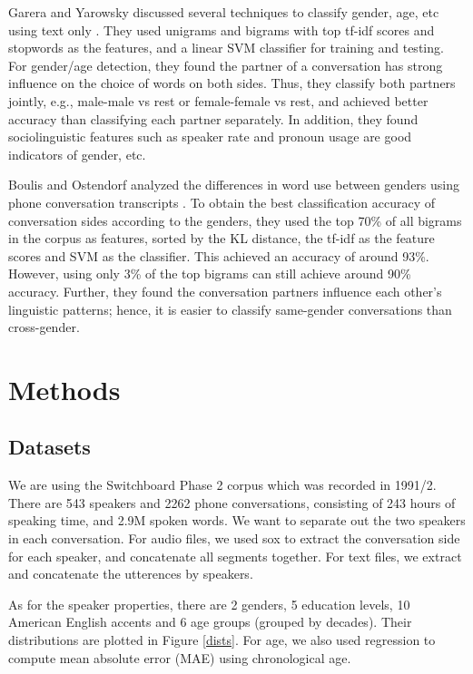 \documentclass[a4paper]{article}
\begin{document}
Garera and Yarowsky discussed several techniques to classify gender, age, etc using text only \cite{garera}. They used unigrams and bigrams with top tf-idf scores and stopwords as the features, and a linear SVM classifier for training and testing. For gender/age detection, they found the partner of a conversation has strong influence on the choice of words on both sides. Thus, they classify both partners jointly, e.g., male-male vs rest or female-female vs rest, and achieved better accuracy than classifying each partner separately. In addition, they found sociolinguistic features such as speaker rate and pronoun usage are good indicators of gender, etc.

Boulis and Ostendorf analyzed the differences in word use between genders using phone conversation transcripts \cite{boulis}. To obtain the best classification accuracy of conversation sides according to the genders, they used the top 70\% of all bigrams in the corpus as features, sorted by the KL distance, the tf-idf as the feature scores and SVM as the classifier. This achieved an accuracy of around 93\%. However, using only 3\% of the top bigrams can still achieve around 90\% accuracy. Further, they found the conversation partners influence each other's linguistic patterns; hence, it is easier to classify same-gender conversations than cross-gender. 

\section{Methods}

\subsection{Datasets}
We are using the Switchboard Phase 2 corpus which was recorded in 1991/2. There are 543 speakers and 2262 phone conversations, consisting of 243 hours of speaking time, and 2.9M spoken words. We want to separate out the two speakers in each conversation. For audio files, we used sox to extract the conversation side for each speaker, and concatenate all segments together. For text files, we extract and concatenate the utterences by speakers.

As for the speaker properties, there are 2 genders, 5 education levels, 10 American English accents and 6 age groups (grouped by decades). Their distributions are plotted in Figure \ref{dists}. For age, we also used regression to compute mean absolute error (MAE) using chronological age.
\end{document}
